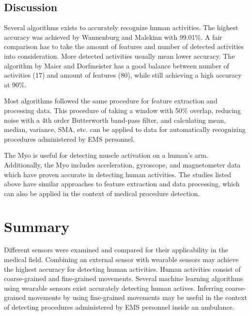 \subsection{Discussion}
Several algorithms exists to accurately recognize human activities. The highest accuracy was achieved by Wannenburg and Malekian \cite{Wannenburg2016} with 99.01\%. A fair comparison has to take the amount of features and number of detected activities into consideration. More detected activities usually mean lower accuracy. The algorithm by Maier and Dorfmeister \cite{Dorfmeister2014} has a good balance between number of activities (17) and amount of features (80), while still achieving a high accuracy at 90\%.
\par Most algorithms followed the same procedure for feature extraction and processing data. This procedure of taking a window with 50\% overlap, reducing noise with a 4th order Butterworth band-pass filter, and calculating mean, median, variance, SMA, etc. can be applied to data for automatically recognizing procedures administered by EMS personnel.
\par The Myo is useful for detecting muscle activation on a human's arm. Additionally, the Myo includes acceleration, gyroscope, and magnetometer data which have proven accurate in detecting human activities. The studies listed above have similar approaches to feature extraction and data processing, which can also be applied in the context of medical procedure detection.

\section{Summary}
\label{sec:Literature-Review:Summary}
Different sensors were examined and compared for their applicability in the medical field. Combining an external sensor with wearable sensors may achieve the highest accuracy for detecting human activities. Human activities consist of coarse-grained and fine-grained movements. Several machine learning algorithms using wearable sensors exist accurately detecting human actives. Inferring coarse-grained movements by using fine-grained movements may be useful in the context of detecting procedures administered by EMS personnel inside an ambulance. 